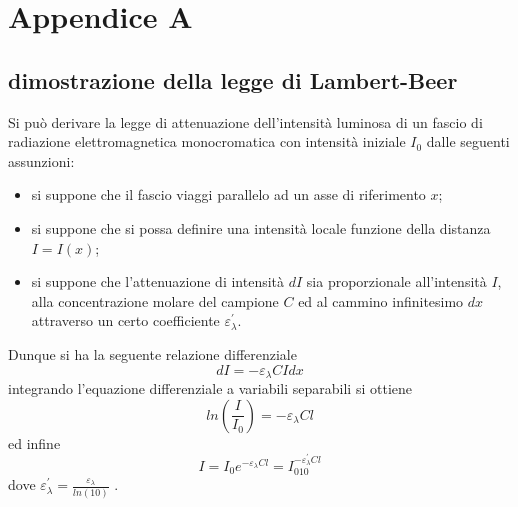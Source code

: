 \documentclass[12pt,a4paper, twoside, openright]{report}
\begin{document}
\section*{Appendice A}


\subsection{dimostrazione della legge di Lambert-Beer}

Si può derivare la legge di attenuazione dell'intensità luminosa di un fascio di radiazione elettromagnetica monocromatica con intensità iniziale $I_0$ dalle seguenti assunzioni:\begin{itemize}
    \item si suppone che il fascio viaggi parallelo ad un asse di riferimento $x$;
    \item si suppone che si possa definire una intensità locale funzione della distanza 		  $I = I(x)$;
    \item si suppone che l'attenuazione di intensità $dI$ sia proporzionale 						  all'intensità $I$, alla concentrazione molare del campione $C$ ed al cammino 				  infinitesimo $dx$ attraverso un certo coefficiente $\varepsilon_{\lambda}^{'}				  $.
\end{itemize}
Dunque si ha la seguente relazione differenziale
\begin{equation*}
    dI = -\varepsilon_{\lambda}CI dx
\end{equation*}
integrando l'equazione differenziale a variabili separabili si ottiene
\begin{equation*}
    ln(\frac{I}{I_0}) = -\varepsilon_{\lambda}Cl
\end{equation*}
ed infine
\begin{equation*}
    I = I_0e^{-\varepsilon_{\lambda}Cl} = I_010^{-\varepsilon_{\lambda}^{'}Cl}
\end{equation*}
dove $\varepsilon_{\lambda}^{'} = \frac{\varepsilon_{\lambda}}{ln(10)}$ .




\thispagestyle{empty}
\newpage
\thispagestyle{empty}
\end{document}
